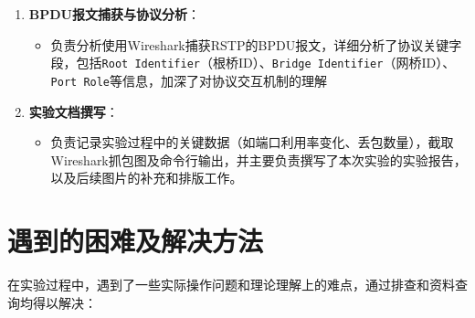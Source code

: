 \documentclass[a4paper]{article}
\begin{document}
\begin{enumerate}
    \item \textbf{BPDU报文捕获与协议分析}：
    \begin{itemize}
        \item 负责分析使用Wireshark捕获RSTP的BPDU报文，详细分析了协议关键字段，包括\texttt{Root Identifier}（根桥ID）、\texttt{Bridge Identifier}（网桥ID）、\texttt{Port Role}等信息，加深了对协议交互机制的理解
    \end{itemize}
    
    \item \textbf{实验文档撰写}：
    \begin{itemize}
        \item 负责记录实验过程中的关键数据（如端口利用率变化、丢包数量），截取Wireshark抓包图及命令行输出，并主要负责撰写了本次实验的实验报告，以及后续图片的补充和排版工作。
    \end{itemize}
\end{enumerate}

\section{遇到的困难及解决方法}

在实验过程中，遇到了一些实际操作问题和理论理解上的难点，通过排查和资料查询均得以解决：
\end{document}
